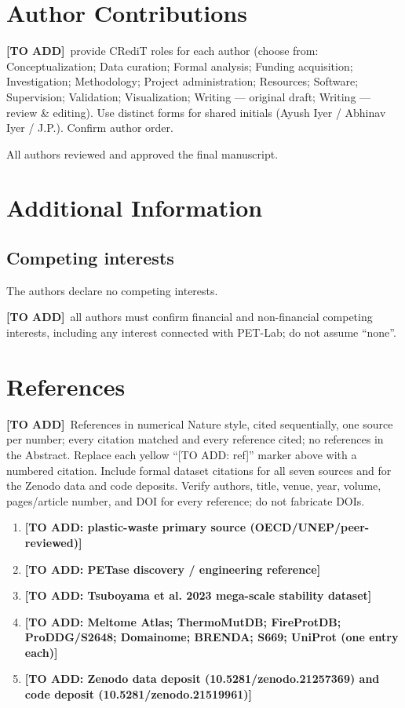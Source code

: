 \documentclass[11pt]{article}
\newcommand{\filler}[1]{\colorbox{filleryellow}{\bfseries [TO ADD: #1]}}
\newcommand{\fillerblock}[1]{%
  \par\smallskip\noindent
  \colorbox{filleryellow}{\parbox{\dimexpr\linewidth-2\fboxsep\relax}{%
    \small\textbf{[TO ADD]}\ #1}}\par\smallskip}
\begin{document}
\section*{Author Contributions}
\fillerblock{provide CRediT roles for each author (choose from: Conceptualization; Data curation; Formal analysis; Funding acquisition; Investigation; Methodology; Project administration; Resources; Software; Supervision; Validation; Visualization; Writing --- original draft; Writing --- review \& editing). Use distinct forms for shared initials (Ayush Iyer / Abhinav Iyer / J.P.). Confirm author order.}
All authors reviewed and approved the final manuscript.

\section*{Additional Information}
\subsection*{Competing interests}
The authors declare no competing interests.
\fillerblock{all authors must confirm financial and non-financial competing interests, including any interest connected with PET-Lab; do not assume ``none''.}

\section*{References}
\fillerblock{References in numerical Nature style, cited sequentially, one source per number; every citation matched and every reference cited; no references in the Abstract. Replace each yellow ``[TO ADD: ref]'' marker above with a numbered citation. Include formal dataset citations for all seven sources and for the Zenodo data and code deposits. Verify authors, title, venue, year, volume, pages/article number, and DOI for every reference; do not fabricate DOIs.}

\begin{enumerate}
  \item \filler{plastic-waste primary source (OECD/UNEP/peer-reviewed)}
  \item \filler{PETase discovery / engineering reference}
  \item \filler{Tsuboyama et al. 2023 mega-scale stability dataset}
  \item \filler{Meltome Atlas; ThermoMutDB; FireProtDB; ProDDG/S2648; Domainome; BRENDA; S669; UniProt (one entry each)}
  \item \filler{Zenodo data deposit (10.5281/zenodo.21257369) and code deposit (10.5281/zenodo.21519961)}
\end{enumerate}
\end{document}
